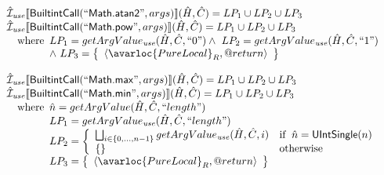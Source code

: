 \[\begin{array}{l}
\aI_{\it use}\lbr \SF{BuiltintCall}(``\SF{Math.atan2}",args)\rbr(\hat{H},\hat{C}) = LP_1 \cup LP_2 \cup LP_3\\
\aI_{\it use}\lbr \SF{BuiltintCall}(``\SF{Math.pow}",args)\rbr(\hat{H},\hat{C}) = LP_1 \cup LP_2 \cup LP_3\\
\quad\wherec{
  LP_1 = getArgValue_{\it use}(\hat{H}, \hat{C}, ``0")
  \land\ LP_2 = getArgValue_{\it use}(\hat{H}, \hat{C}, ``1")\\
  \land\ LP_3 = \set{\langle\avarloc{PureLocal}_R,\varprop{return}\rangle}\\
  }\\
\\

\aI_{\it use}\lbr \SF{BuiltintCall}(``\SF{Math.max}",args)\rbr(\hat{H},\hat{C}) = LP_1 \cup LP_2 \cup LP_3\\
\aI_{\it use}\lbr \SF{BuiltintCall}(``\SF{Math.min}",args)\rbr(\hat{H},\hat{C}) = LP_1 \cup LP_2 \cup LP_3\\
\quad\wherec{
  \hat{n} = getArgValue(\hat{H}, \hat{C}, ``length")\\
  LP_1 = getArgValue_{\it use}(\hat{H}, \hat{C}, ``length")\\
  LP_2 = \left\{\begin{array}{ll}
      \bigsqcup_{i \in \{0, ..., n-1\}} getArgValue_{\it use}(\hat{H}, \hat{C}, i)
      & \ifc{\hat{n} = \SF{UIntSingle}(n)} \\
      \set{} & \owc
    \end{array}\right.\\
  LP_3 = \set{\langle\avarloc{PureLocal}_R,\varprop{return}\rangle}\\
  }\\
\\









\end{array}
\]


